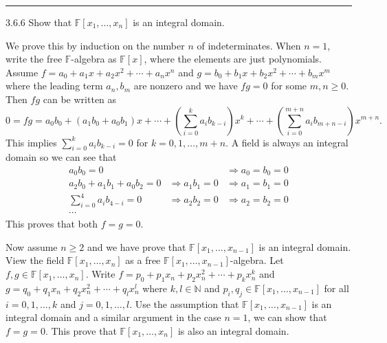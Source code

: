 \documentclass[a4paper, 12pt]{article}
\begin{document}
\noindent\rule{7in}{2.8pt}
\begin{problem}{3.6.6}
Show that \(\mathbb{F}[x_1,\ldots,x_n]\) is an integral domain.
	
\end{problem}
\begin{solution}
We prove this by induction on the number \(n\) of indeterminates. When \(n=1\), write the free \(\mathbb{F}\)-algebra as \(\mathbb{F}[x]\), where the elements are just polynomials. Assume 
\(f=a_0+a_1x+a_2x^2+\cdots+a_nx^n\) and \(g=b_0+b_1x+b_2x^2+\cdots+b_mx^m\) where the leading term \(a_n,b_m\) are nonzero and we have \(fg=0\) for some \(m,n\geq 0\). Then \(fg\) can be written as 
\[0=fg=a_0b_0+(a_1b_0+a_0b_1)x+\cdots+(\sum_{i=0}^{k}a_ib_{k-i})x^k+\cdots+(\sum_{i=0}^{m+n}a_ib_{m+n-i})x^{m+n}.\]
This implies \(\sum_{i=0}^{k}a_ib_{k-i}=0\) for \(k=0,1,\ldots,m+n\). A field is always an integral domain so we can see that 
\begin{align*}
	a_0b_0=0 & & \Rightarrow a_0=b_0=0  \\ 
	a_2b_0+a_1b_1+a_0b_2=0 & \Rightarrow a_1b_1=0 &\Rightarrow a_1=b_1=0\\ 
	\sum_{i=0}^{4}a_ib_{4-i}=0 &\Rightarrow a_2b_2=0 &\Rightarrow a_2=b_2=0\\ 
	\cdots 
\end{align*}
This proves that both \(f=g=0\).
\par 
Now assume \(n\geq 2\) and we have prove that \(\mathbb{F}[x_1,\ldots,x_{n-1}]\) is an integral domain. View the field \(\mathbb{F}[x_1,\ldots,x_n]\) as a free \(\mathbb{F}[x_1,\ldots,x_{n-1}]\)-algebra. 
Let \(f,g\in \mathbb{F}[x_1,\ldots,x_n]\). Write \(f=p_0+p_1x_n+p_2x_n^2+\cdots+p_kx_n^k\) and \(g=q_0+q_1x_n+q_2x_n^2+\cdots+q_lx_n^l\) where \(k,l\in \mathbb{N}\) and \(p_i,q_j\in \mathbb{F}[x_1,\ldots,x_{n-1}]\) for all 
\(i=0,1,\ldots,k\) and \(j=0,1,\ldots,l\). Use the assumption that \(\mathbb{F}[x_1,\ldots,x_{n-1}]\) is an integral domain and a similar argument in the case \(n=1\), we can show that \(f=g=0\). This prove that \(\mathbb{F}[x_1,\ldots,x_n]\) is also 
an integral domain. 
\end{solution}
\end{document}
